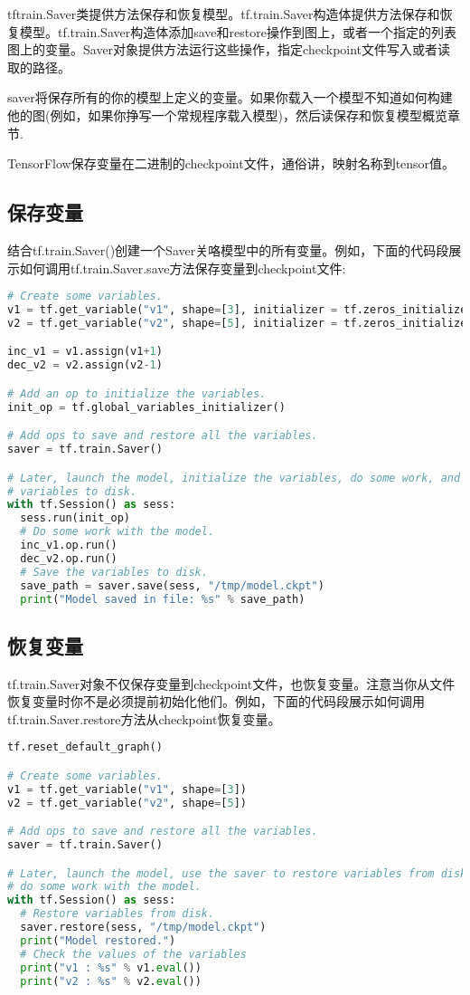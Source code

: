 tftrain.Saver类提供方法保存和恢复模型。tf.train.Saver构造体提供方法保存和恢复模型。tf.train.Saver构造体添加save和restore操作到图上，或者一个指定的列表图上的变量。Saver对象提供方法运行这些操作，指定checkpoint文件写入或者读取的路径。

saver将保存所有的你的模型上定义的变量。如果你载入一个模型不知道如何构建他的图(例如，如果你挣写一个常规程序载入模型)，然后读保存和恢复模型概览章节.

TensorFlow保存变量在二进制的checkpoint文件，通俗讲，映射名称到tensor值。
\subsection{保存变量}
结合tf.train.Saver()创建一个Saver关咯模型中的所有变量。例如，下面的代码段展示如何调用tf.train.Saver.save方法保存变量到checkpoint文件:
\begin{lstlisting}[language=Python]
# Create some variables.
v1 = tf.get_variable("v1", shape=[3], initializer = tf.zeros_initializer)
v2 = tf.get_variable("v2", shape=[5], initializer = tf.zeros_initializer)

inc_v1 = v1.assign(v1+1)
dec_v2 = v2.assign(v2-1)

# Add an op to initialize the variables.
init_op = tf.global_variables_initializer()

# Add ops to save and restore all the variables.
saver = tf.train.Saver()

# Later, launch the model, initialize the variables, do some work, and save the
# variables to disk.
with tf.Session() as sess:
  sess.run(init_op)
  # Do some work with the model.
  inc_v1.op.run()
  dec_v2.op.run()
  # Save the variables to disk.
  save_path = saver.save(sess, "/tmp/model.ckpt")
  print("Model saved in file: %s" % save_path)
\end{lstlisting}
\subsection{恢复变量}
tf.train.Saver对象不仅保存变量到checkpoint文件，也恢复变量。注意当你从文件恢复变量时你不是必须提前初始化他们。例如，下面的代码段展示如何调用tf.train.Saver.restore方法从checkpoint恢复变量。
\begin{lstlisting}[language=Python]
tf.reset_default_graph()

# Create some variables.
v1 = tf.get_variable("v1", shape=[3])
v2 = tf.get_variable("v2", shape=[5])

# Add ops to save and restore all the variables.
saver = tf.train.Saver()

# Later, launch the model, use the saver to restore variables from disk, and
# do some work with the model.
with tf.Session() as sess:
  # Restore variables from disk.
  saver.restore(sess, "/tmp/model.ckpt")
  print("Model restored.")
  # Check the values of the variables
  print("v1 : %s" % v1.eval())
  print("v2 : %s" % v2.eval())
\end{lstlisting}
